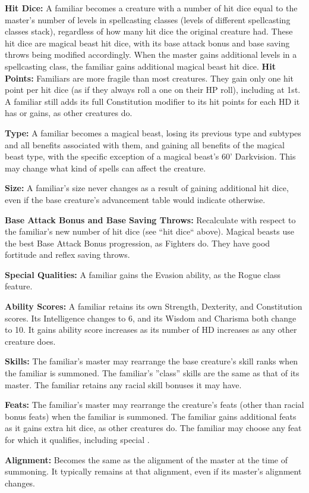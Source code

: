 \begin{list}{}{\leftmargin=1em}
 \item \textbf{Hit Dice:} A familiar becomes a creature with a number of hit dice equal to the master's number of levels in spellcasting classes (levels of different spellcasting classes stack), 
 regardless of how many hit dice the original creature had. These hit dice are magical beast hit dice, with its base attack bonus and base saving throws being modified accordingly.
 When the master gains additional levels in a spellcasting class, the familiar gains additional magical beast hit dice.
 \subitem \textbf{Hit Points:} Familiars are more fragile than most creatures. They gain only one hit point per hit dice (as if they always roll a one on their HP roll), including at 1st. 
 A familiar still adds its full Constitution modifier to its hit points for each HD it has or gains, as other creatures do.
 \item \textbf{Type:} A familiar becomes a magical beast, losing its previous type and subtypes and all benefits associated with them, and gaining all benefits of the magical beast type, with the specific exception
 of a magical beast's 60' Darkvision. This may change what kind of spells can affect the creature.
 \item \textbf{Size:} A familiar's size never changes as a result of gaining additional hit dice, even if the base creature's advancement table would indicate otherwise.
 \item \textbf{Base Attack Bonus and Base Saving Throws:} Recalculate with respect to the familiar's new number of hit dice (see ``hit dice`` above). 
 Magical beasts use the best Base Attack Bonus progression, as Fighters do. They have good fortitude and reflex saving throws.
 \item \textbf{Special Qualities:} A familiar gains the Evasion ability, as the Rogue class feature.
 \item \textbf{Ability Scores:} A familiar retains its own Strength, Dexterity, and Constitution scores. Its Intelligence changes to 6, and its Wisdom and Charisma both change to 10.
 It gains ability score increases as its number of HD increases as any other creature does.
 \item \textbf{Skills:} The familiar's master may rearrange the base creature's skill ranks when the familiar is summoned. 
 The familiar's ''class'' skills are the same as that of its master. The familiar retains any racial skill bonuses it may have.
 \item \textbf{Feats:} The familiar's master may rearrange the creature's feats (other than racial bonus feats) when the familiar is summoned.
 The familiar gains additional feats as it gains extra hit dice, as other creatures do. The familiar may choose any feat for which it qualifies, including special .
 \item \textbf{Alignment:} Becomes the same as the alignment of the master at the time of summoning. It typically remains at that alignment, even if its master's alignment changes.
\end{list}

